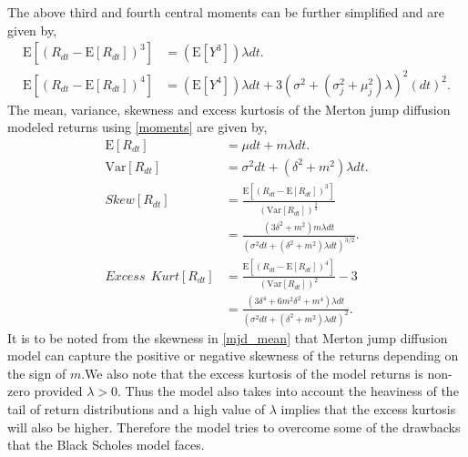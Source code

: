 \documentclass[12pt]{report}
\newcommand{\E}{\mathrm{E}}
\newcommand{\Var}{\mathrm{Var}}
\begin{document}
The above third and fourth central moments can be further simplified and are given by,
\begin{equation}
    \begin{aligned}
     \E[(R_{dt}- \E[R_{dt}])^{3}] &= (\E[Y^{3}])  \lambda dt.\\
     \E[(R_{dt}- \E[R_{dt}])^{4}] &= (\E[Y^{4}])\lambda dt + 3 (\sigma^{2} + (\sigma^{2}_j + \mu^{2}_{j})\lambda)^{2}(dt)^{2}.
    \end{aligned}
    \label{moments1}
\end{equation}
The mean, variance, skewness and excess kurtosis of the Merton jump diffusion modeled returns using \ref{moments} are given by,\\

\begin{equation}
    \begin{aligned}
    \E[R_{dt}] &= \mu dt + m \lambda dt. \\
    \Var[R_{dt}]& = \sigma^{2} dt + (\delta^{2} + m^2) \lambda dt.\\
    Skew[R_{dt}] &= \frac{\E[(R_{dt}- \E[R_{dt}])^{3}]}{(\Var[R_{dt}])^{\frac{3}{2}}}\\
    & = \frac{(3 \delta^{2} + m^{2}) m \lambda dt}{(\sigma^{2} dt + (\delta^{2} + m^2) \lambda dt)^{3/2}}.\\
    Excess~~Kurt[R_{dt}] &= \frac{\E[(R_{dt}- \E[R_{dt}])^{4}]}{(\Var[R_{dt}])^{2}} - 3\\
    & = \frac{(3 \delta^{4} + 6 m^{2} \delta^{2} + m^{4})\lambda dt}{(\sigma^{2} dt + (\delta^{2} + m^2) \lambda dt)^{2}}.
    \end{aligned}
\label{mjd_mean}    
\end{equation}
It is to be noted from the skewness in \ref{mjd_mean} that Merton jump diffusion model can capture the positive or negative skewness of the returns depending on the sign of $m$.We also note that the excess kurtosis of the model returns is non-zero provided $\lambda > 0 $. Thus the model also takes into account the heaviness of the tail of return distributions and a high value of $\lambda$ implies that the excess kurtosis will also be higher. Therefore the model tries to overcome some of the drawbacks that the Black Scholes model faces.  
\end{document}
